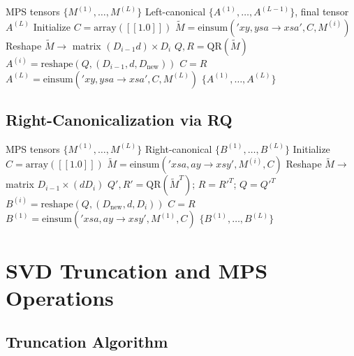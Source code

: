 \documentclass[aps,prb,onecolumn,scriptaddress]{revtex4-2}
\begin{document}
	\begin{algorithm}[H]
		\caption{LeftCanonicalize}
		\begin{algorithmic}[1]
			\Require MPS tensors $\{M^{(1)}, \ldots, M^{(L)}\}$
			\Ensure Left-canonical $\{A^{(1)}, \ldots, A^{(L-1)}\}$, final tensor $A^{(L)}$
			\State Initialize $C = \text{array}([[1.0]])$ 
			\State $\tilde{M} = \text{einsum}('xy,ysa \to xsa', C, M^{(i)})$
			\State Reshape $\tilde{M} \to$ matrix $(D_{i-1}d) \times D_i$
			\State $Q, R = \text{QR}(\tilde{M})$ 
			\State $A^{(i)} = \text{reshape}(Q, (D_{i-1}, d, D_{\text{new}}))$
			\State $C = R$
			\EndFor
			\State $A^{(L)} = \text{einsum}('xy,ysa \to xsa', C, M^{(L)})$
			\State \Return $\{A^{(1)}, \ldots, A^{(L)}\}$
		\end{algorithmic}
	\end{algorithm}
	
	\subsection{Right-Canonicalization via RQ}
	
	\begin{algorithm}[H]
		\caption{RightCanonicalize}
		\begin{algorithmic}[1]
			\Require MPS tensors $\{M^{(1)}, \ldots, M^{(L)}\}$
			\Ensure Right-canonical $\{B^{(1)}, \ldots, B^{(L)}\}$
			\State Initialize $C = \text{array}([[1.0]])$
			\State $\tilde{M} = \text{einsum}('xsa,ay \to xsy', M^{(i)}, C)$
			\State Reshape $\tilde{M} \to$ matrix $D_{i-1} \times (dD_i)$
			\State $Q', R' = \text{QR}(\tilde{M}^T)$; \quad $R = R'^T$; \quad $Q = Q'^T$
			\State $B^{(i)} = \text{reshape}(Q, (D_{\text{new}}, d, D_i))$
			\State $C = R$
			\EndFor
			\State $B^{(1)} = \text{einsum}('xsa,ay \to xsy', M^{(1)}, C)$
			\State \Return $\{B^{(1)}, \ldots, B^{(L)}\}$
		\end{algorithmic}
	\end{algorithm}
	
	\section{SVD Truncation and MPS Operations}
	
	\subsection{Truncation Algorithm}
	
\end{document}
